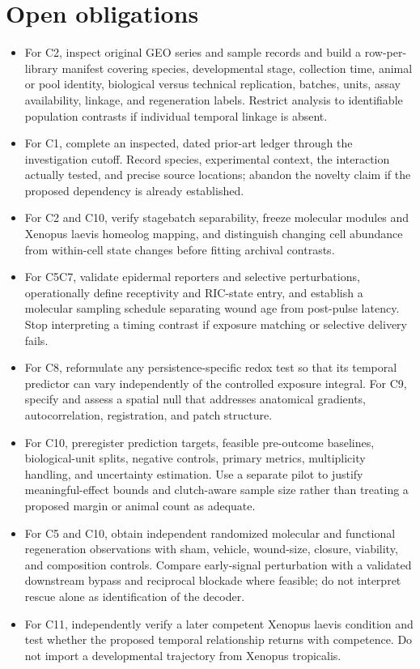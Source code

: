 \documentclass[11pt]{article}
\begin{document}
\section{Open obligations}
\begin{itemize}
\item For C2, inspect original GEO series and sample records and build a row-per-library manifest covering species, developmental stage, collection time, animal or pool identity, biological versus technical replication, batches, units, assay availability, linkage, and regeneration labels. Restrict analysis to identifiable population contrasts if individual temporal linkage is absent.
\item For C1, complete an inspected, dated prior-art ledger through the investigation cutoff. Record species, experimental context, the interaction actually tested, and precise source locations; abandon the novelty claim if the proposed dependency is already established.
\item For C2 and C10, verify stage\textendash{}batch separability, freeze molecular modules and Xenopus laevis homeolog mapping, and distinguish changing cell abundance from within-cell state changes before fitting archival contrasts.
\item For C5\textendash{}C7, validate epidermal reporters and selective perturbations, operationally define receptivity and RIC-state entry, and establish a molecular sampling schedule separating wound age from post-pulse latency. Stop interpreting a timing contrast if exposure matching or selective delivery fails.
\item For C8, reformulate any persistence-specific redox test so that its temporal predictor can vary independently of the controlled exposure integral. For C9, specify and assess a spatial null that addresses anatomical gradients, autocorrelation, registration, and patch structure.
\item For C10, preregister prediction targets, feasible pre-outcome baselines, biological-unit splits, negative controls, primary metrics, multiplicity handling, and uncertainty estimation. Use a separate pilot to justify meaningful-effect bounds and clutch-aware sample size rather than treating a proposed margin or animal count as adequate.
\item For C5 and C10, obtain independent randomized molecular and functional regeneration observations with sham, vehicle, wound-size, closure, viability, and composition controls. Compare early-signal perturbation with a validated downstream bypass and reciprocal blockade where feasible; do not interpret rescue alone as identification of the decoder.
\item For C11, independently verify a later competent Xenopus laevis condition and test whether the proposed temporal relationship returns with competence. Do not import a developmental trajectory from Xenopus tropicalis.
\end{itemize}
\end{document}
